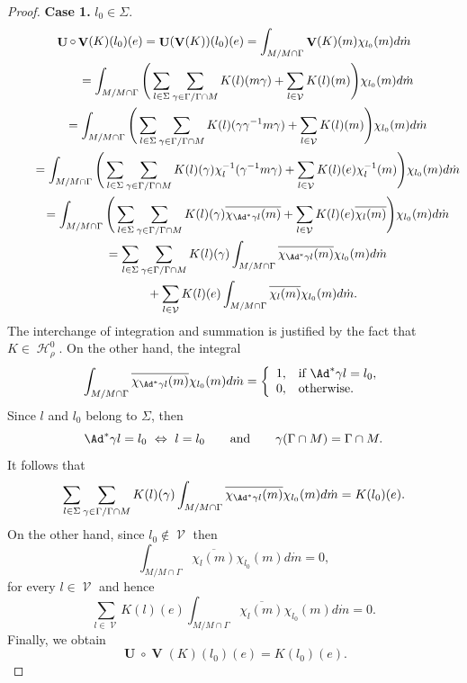 \documentclass[pdftex]{sigma}
\DeclareMathOperator{\U}{\mathbf{U}}
\DeclareMathOperator{\V}{\mathbf{V}} \DeclareMathOperator{\Aut}{Aut}
\DeclareMathOperator{\nongen}{\mathcal{V}}
\DeclareMathOperator{\Hi}{\mathscr{H}}
\begin{document}
\begin{proof}
\textbf{Case 1.}  $l_0\in \Sigma$.
\begin{gather*}
\U\circ \V(K)(l_0)(e) = \U( \V(K))(l_0)(e)  = \int_{M/M\cap \Gamma} \V(K)(m) \chi_{l_0}(m) d\dot{m}\\
\qquad{} = \int_{M/M\cap \Gamma} \Bigg( \sum_{l\in \Sigma}
\sum_{\gamma\in \Gamma/\Gamma\cap M} K(l)(m\gamma)+ \sum
_{l\in \nongen} K(l) (m)\Bigg)\chi_{l_0}(m) d\dot{m}\\
\qquad{} = \int_{M/M\cap \Gamma} \Bigg( \sum_{l\in \Sigma}
\sum_{\gamma\in \Gamma/\Gamma\cap M} K(l)(\gamma \gamma
^{-1}m\gamma)+ \sum
_{l\in \nongen} K(l) (m)\Bigg)\chi_{l_0}(m) d\dot{m}\\
\qquad{} = \int_{M/M\cap \Gamma} \Bigg( \sum_{l\in \Sigma}
\sum_{\gamma\in \Gamma/\Gamma\cap M} K(l)(\gamma
)\chi_{l}^{-1}(\gamma ^{-1}m\gamma) + \sum
_{l\in \nongen} K(l) (e)\chi_l^{-1}(m)\Bigg)\chi_{l_0}(m) d\dot{m}\\
\qquad{} = \int_{M/M\cap \Gamma} \Bigg( \sum_{l\in \Sigma}
\sum_{\gamma\in \Gamma/\Gamma\cap M} K(l)(\gamma
)\overline{\chi_{\Ad^*\gamma l}(m)} + \sum
_{l\in \nongen} K(l) (e)\overline{\chi_l(m)}\Bigg)\chi_{l_0}(m) d\dot{m}\\
\qquad{} =   \sum_{l\in \Sigma} \sum_{\gamma\in \Gamma/\Gamma\cap M}
K(l)(\gamma )\int_{M/M\cap \Gamma} \overline{\chi_{\Ad^*\gamma
l}(m)}\chi_{l_0}(m) d\dot{m} \\
\qquad\quad{} + \sum _{l\in \nongen} K(l) (e)
\int_{M/M\cap \Gamma} \overline{\chi_l(m)}\chi_{l_0}(m) d\dot{m}.
\end{gather*}
The interchange of integration and summation is justif\/ied by the
fact that $K\in \Hi^0_\rho$. On the other hand, the integral
\[
\int_{M/M\cap \Gamma}
\overline{\chi_{\Ad^*\gamma l}(m)} \chi_{l_0}(m) d\dot{m} = \left\{
  \begin{array}{ll}
    1, & \hbox{if} \ \Ad^*\gamma l = l_0, \\
    0, & \hbox{otherwise.}
  \end{array}
\right.
\]
Since $l$ and $l_0$ belong to $\Sigma$, then
\[
\Ad^*\gamma l= l_0 \ \Leftrightarrow \ l = l_{0}\qquad \mbox{and} \qquad
\gamma(\Gamma\cap M)= \Gamma\cap M.
\] It follows that
\[
\sum_{l\in \Sigma} \sum_{\gamma\in \Gamma/\Gamma\cap M}
K(l)(\gamma )\int_{M/M\cap \Gamma} \overline{\chi_{\Ad^*\gamma
l}(m)}\chi_{l_0}(m) d\dot{m}=K(l_0)(e).
\] On the other hand, since
$l_0\not\in \nongen$ then
\[
\int_{M/M\cap \Gamma}
\overline{\chi_l(m)}\chi_{l_0}(m) d\dot{m}=0,
\] for every $l\in
\nongen$ and hence
\[
\sum _{l\in \nongen} K(l) (e)
\int_{M/M\cap \Gamma} \overline{\chi_l(m)}\chi_{l_0}(m)
d\dot{m}=0.
\] Finally, we obtain
\[
\U\circ \V(K)(l_0)(e)= K(l_0)(e).
\]





\end{proof}
\end{document}
